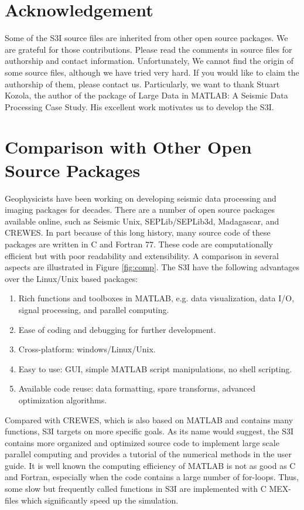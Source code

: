 \documentclass[11pt,titlepage]{article}
\theoremstyle{plain}
\theoremstyle{definition}
\theoremstyle{remark}
\numberwithin{equation}{section}
\begin{document}
\section*{Acknowledgement}
Some of the S3I source files are inherited from other open source packages. We are grateful for those contributions. Please read the comments in source files for authorship and contact information. Unfortunately, We cannot find the origin of some source files, although we have tried very hard. If you would like to claim the authorship of them, please contact us.
Particularly, we
want to thank Stuart Kozola\cite{Kozola:2011aa}, the author of the package of Large Data in MATLAB: A Seismic Data Processing Case Study. His excellent work motivates us to develop the S3I.  

\appendix
\section{Comparison with Other Open Source Packages}
Geophysicists have been working on developing seismic data processing and imaging packages for decades. There are a number of open source packages available online, such as Seismic Unix, SEPLib/SEPLib3d, Madagascar, and CREWES. In part because of this long history, many source code of these packages are written in C and Fortran 77. These code are computationally efficient but with poor readability and extensibility. A comparison in several aspects are illustrated in Figure \ref{fig:comp}. The
S3I have the following advantages over the Linux/Unix based packages: 
\begin{enumerate}
\item Rich functions and toolboxes in MATLAB, e.g. data visualization, data I/O, signal processing, and parallel computing.
\item Ease of coding and debugging for further development.
\item Cross-platform: windows/Linux/Unix.
\item Easy to use: GUI, simple MATLAB script manipulations, no shell scripting.
\item Available code reuse: data formatting, spare transforms, advanced optimization algorithms.
\end{enumerate}
Compared with CREWES, which is also based on MATLAB and contains many functions, S3I targets on more specific goals. As its name would suggest, the S3I contains more organized and optimized source code to implement large scale parallel computing and provides a tutorial of the numerical methods in the user guide. It is well known the computing efficiency of MATLAB is not as good as C and Fortran, especially when the code contains a large number of for-loops. Thus, some slow but frequently called functions in S3I are implemented with C MEX-files which significantly speed up the simulation.  
\end{document}
